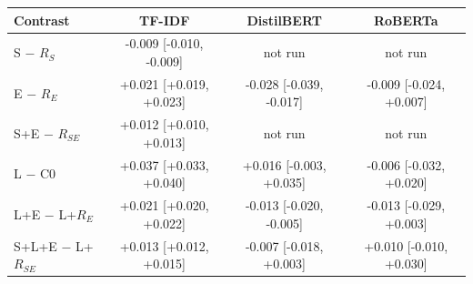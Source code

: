 \begin{tabular}{@{}lccc@{}}
\toprule
Contrast & TF-IDF & DistilBERT & RoBERTa\\
\midrule
S $-$ $R_S$ & -0.009 [-0.010, -0.009] & not run & not run\\
E $-$ $R_E$ & +0.021 [+0.019, +0.023] & -0.028 [-0.039, -0.017] & -0.009 [-0.024, +0.007]\\
S+E $-$ $R_{SE}$ & +0.012 [+0.010, +0.013] & not run & not run\\
L $-$ C0 & +0.037 [+0.033, +0.040] & +0.016 [-0.003, +0.035] & -0.006 [-0.032, +0.020]\\
L+E $-$ L+$R_E$ & +0.021 [+0.020, +0.022] & -0.013 [-0.020, -0.005] & -0.013 [-0.029, +0.003]\\
S+L+E $-$ L+$R_{SE}$ & +0.013 [+0.012, +0.015] & -0.007 [-0.018, +0.003] & +0.010 [-0.010, +0.030]\\
\bottomrule
\end{tabular}
